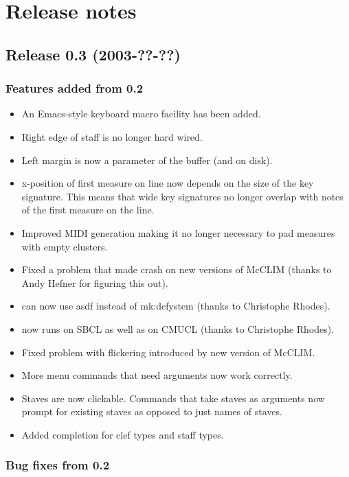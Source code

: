 \chapter{Release notes}

\section{Release 0.3 (2003-??-??)}

\subsection{Features added from 0.2}

\begin{itemize}
\item An Emacs-style keyboard macro facility has been added. 
\item Right edge of staff is no longer hard wired.
\item Left margin is now a parameter of the buffer (and on disk).
\item x-position of first measure on line now depends on the size of
  the key signature.  This means that wide key signatures no longer
  overlap with notes of the first measure on the line.
\item Improved MIDI generation making it no longer necessary to pad 
measures with empty clusters.
\item Fixed a problem that made {\gs} crash on new versions of
  McCLIM (thanks to Andy Hefner for figuring this out). 
\item {\gs} can now use asdf instead of mk:defystem (thanks to
  Christophe Rhodes).
\item {\gs} now runs on SBCL as well as on CMUCL (thanks to Christophe
  Rhodes).
\item Fixed problem with flickering introduced by new version of McCLIM.
\item More menu commands that need arguments now work correctly.
\item Staves are now clickable.  Commands that take staves as
  arguments now prompt for existing staves as opposed to just names of
  staves. 
\item Added completion for clef types and staff types. 
\end{itemize}

\subsection{Bug fixes from 0.2}

